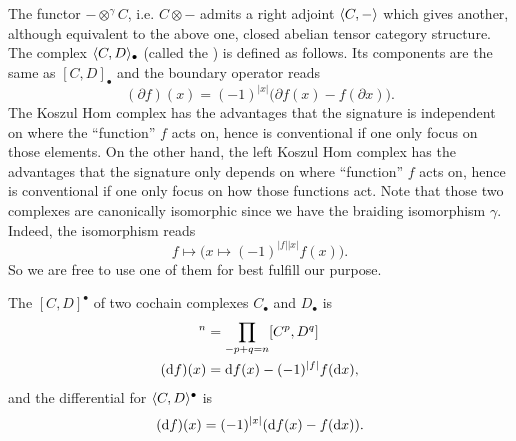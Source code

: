 \begin{Rem}
The functor $-\otimes^{\gamma}C$, i.e. $C\otimes-$ admits 
a right adjoint $\langle C,-\rangle$ which gives another, 
although equivalent to the above one, 
closed abelian tensor category structure.
The complex $\langle C,D\rangle_{\bullet}$ 
(called the ) is defined as follows. 
Its components are the same as $[C,D]_{\bullet}$ and the boundary 
operator reads
\[
(\partial f)(x) = (-1)^{|x|}\big(\partial f(x) - f(\partial x)\big).
\]
The Koszul Hom complex has the advantages that the signature 
is independent on where the ``function'' $f$ acts on, 
hence is conventional if one only focus on those elements. 
On the other hand, the left Koszul Hom complex 
has the advantages that the signature only depends on 
where ``function'' $f$ acts on, 
hence is conventional if one only focus on how those functions act. 
Note that those two complexes are canonically isomorphic 
since we have the braiding isomorphism  $\gamma$. 
Indeed, the isomorphism reads
\[
f\longmapsto
\big(
x\mapsto (-1)^{|f||x|}f(x)
\big).
\]
So we are free to use one of them for best fulfill our purpose.
\end{Rem}
\begin{Rem}
The  $[C,D]^{\bullet}$ of two cochain complexes
$C_{\bullet}$ and $D_{\bullet}$ is
\begin{align*}
[C,D]^n &= \prod_{-p+q=n}[C^p,D^q] \\
(\di f)(x) &= \di f(x)- (-1)^{|f|}f(\di x),
\end{align*}
and the differential for  $\langle C,D\rangle^{\bullet}$ 
is
\[
(\mathrm{d} f)(x) = (-1)^{|x|}(\mathrm{d} f(x) - f(\mathrm{d} x)).
\]
\end{Rem}

